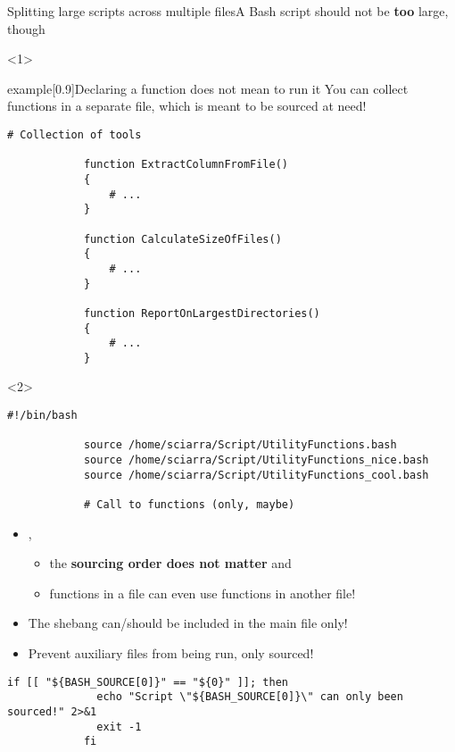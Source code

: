 \begin{frame}[fragile]{Splitting large scripts across multiple files}{A Bash script should not be \textbf{too} large, though}
    \vspace{-3mm}
    \begin{onlyenv}<1>
        \begin{varblock}{example}[0.9\textwidth]{Declaring a function does not mean to run it}
            You can collect functions in a separate file, which is meant to be sourced at need!
        \end{varblock}
        \begin{lstlisting}[style=MyBash, numbers=none]
            # Collection of tools

            function ExtractColumnFromFile()
            {
                # ...
            }

            function CalculateSizeOfFiles()
            {
                # ...
            }

            function ReportOnLargestDirectories()
            {
                # ...
            }
        \end{lstlisting}
    \end{onlyenv}
    \begin{onlyenv}<2>
        \begin{lstlisting}[style=MyBash, numbers=none]
            #!/bin/bash

            source /home/sciarra/Script/UtilityFunctions.bash
            source /home/sciarra/Script/UtilityFunctions_nice.bash
            source /home/sciarra/Script/UtilityFunctions_cool.bash

            # Call to functions (only, maybe)
        \end{lstlisting}
        \begin{itemize}
            \item {},
                  \begin{itemize}
                      \item the \textbf{sourcing order does not matter} and
                      \item functions in a file can even use functions in another file!
                  \end{itemize}
            \item The shebang can/should be included in the main file only!
            \item Prevent auxiliary files from being run, only sourced!
        \end{itemize}
        \begin{lstlisting}[style=MyBash, numbers=none, xleftmargin=1mm, xrightmargin=1mm]
            if [[ "${BASH_SOURCE[0]}" == "${0}" ]]; then
              echo "Script \"${BASH_SOURCE[0]}\" can only been sourced!" 2>&1
              exit -1
            fi
        \end{lstlisting}
    \end{onlyenv}
\end{frame}
